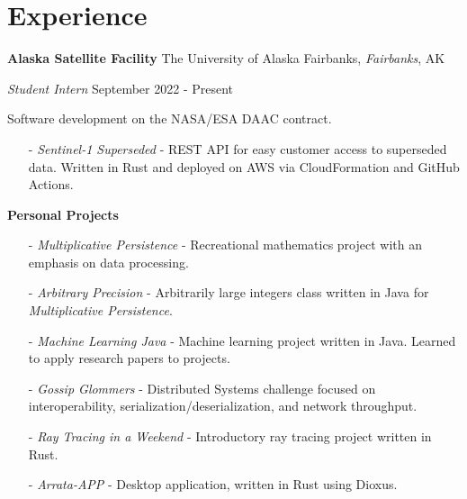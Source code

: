 ﻿\section{Experience}

\textbf{Alaska Satellite Facility}
\hfill
The University of Alaska Fairbanks, \textit{Fairbanks}, AK

\textit{Student Intern}
\hfill
{September 2022 - Present}

Software development on the NASA/ESA DAAC contract.

\begin{itemize}
    \item [-] \textit{Sentinel-1 Superseded} - REST API for easy customer access to superseded data. Written in Rust and deployed on AWS via CloudFormation and GitHub Actions.
    
\end{itemize}

\bigbreak

\textbf{Personal Projects}
\begin{itemize}\setlength\itemsep{0.05cm}
    \item [-] \textit{Multiplicative Persistence} - Recreational mathematics project with an emphasis on data processing.
    \item [-] \textit{Arbitrary Precision} - Arbitrarily large integers class written in Java for \textit{Multiplicative Persistence}.
    \item [-] \textit{Machine Learning Java} - Machine learning project written in Java. Learned to apply research papers to projects.
    \item [-] \textit{Gossip Glommers} - Distributed Systems challenge focused on interoperability, serialization/deserialization, and network throughput.
    \item [-] \textit{Ray Tracing in a Weekend} - Introductory ray tracing project written in Rust.
    \item [-] \textit{Arrata-APP} - Desktop application, written in Rust using Dioxus.
\end{itemize}